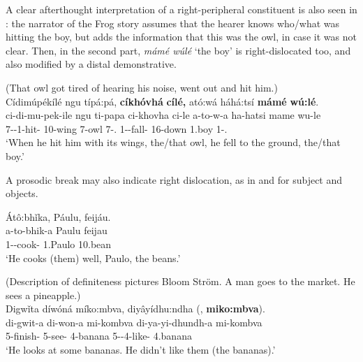 \documentclass[output=paper]{langscibook}
\begin{document}
\z

A clear afterthought interpretation of a right-peripheral constituent is also seen in : the narrator of the Frog story assumes that the hearer knows who\slash what was hitting the boy, but adds the information that this was the owl, in case it was not clear. Then, in the second part, \textit{mámé wúlé} ‘the boy’ is right-dislocated too, and also modified by a distal demonstrative.
\pagebreak

\ea
\label{bkm:Ref121989942}
(That owl got tired of hearing his noise, went out and hit him.)\\
Cídimúpékílé ngu típá:pá, \textbf{cíkhóvhá} \textbf{cílé,} ató:wá háhá:tsí \textbf{mámé} \textbf{wú:lé}. \\
\gll
ci-di-mu-pek-ile  ngu  ti-papa  ci-khovha  ci-le  a-to-w-a  ha-hatsi  mame  wu-le  \\
7\SM{}-\DEP{}-1\OM{}-hit-\PFV{}  \PREP{}  10-wing  7-owl  7\SM{}-\DEM{}.\MED{}  1\SM{}-\PST{}-fall-\FV{}  16-down 1.boy  1\SM{}-\DEM.\MED{}\\
\glt
‘When he hit him with its wings, the/that owl, he fell to the ground, the/that boy.’

\z

A prosodic break may also indicate right dislocation, as in  and  for subject and objects.

\ea
\label{bkm:Ref146700838}
Átô:bhǐka, Páulu, feijáu.\\
\gll
a-to-bhik-a  Paulu  feijau\\
1\SM{}-\TO{}-cook-\FV{}  1.Paulo  10.bean\\
\glt
‘He cooks (them) well, Paulo, the beans.’\\

\z

\ea
\label{bkm:Ref141360524}
(Description of definiteness pictures Bloom Ström. A man goes to the market. He sees a pineapple.)\\
Digwǐta díwóná míko:mbva, diyâyídhu:ndha (, \textbf{miko:mbva}).\\
\gll
di-gwit-a  di-won-a  mi-kombva  di-ya-yi-dhundh-a  mi-kombva\\
5\SM{}-finish-\FV{}  5\SM{}-see-\FV{}  4-banana  5\SM{}-\NEG{}-4\OM{}-like-\FV{}  4.banana\\
\glt
‘He looks at some bananas. He didn’t like them (the bananas).’\\
\end{document}
